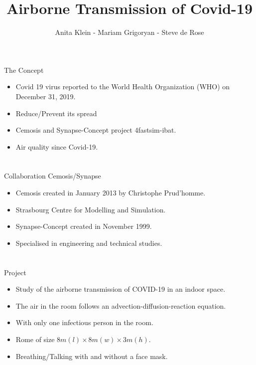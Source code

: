 \documentclass[10pt]{beamer}
\author{Anita Klein - Mariam Grigoryan - Steve de Rose}
\title{Airborne Transmission of Covid-19}
\newcommand{\PI}{}
\newcommand{\PII}{}
\newcommand{\PIII}{}
\begin{document}
    
\begin{frame}

    \maketitle

\end{frame}


\section{\PI} 
\begin{frame}{The Concept}{\PI} 
    \begin{itemize}
        \item Covid 19 virus reported to the World Health Organization (WHO) on December 31, 2019. 
        \item Reduce/Prevent its spread
        \item Cemosis and Synapse-Concept project 4fastsim-ibat. 
        \item Air quality since Covid-19.
    \end{itemize}  

\end{frame}

\section{\PII} 
\begin{frame}{Collaboration Cemosis/Synapse}{\PII} 
    \begin{itemize}
        \item Cemosis created in January 2013 by Christophe Prud’homme. 
        \item Strasbourg Centre for Modelling and Simulation.
        \item Synapse-Concept created in November 1999.
        \item Specialised in engineering and technical studies.
    \end{itemize}  

\end{frame}

\section{\PIII} 
\begin{frame}{Project}{\PIII} 
    \begin{itemize}
        \item Study of the airborne transmission of COVID-19 in an indoor space.
        \item The air in the room follows an advection-diffusion-reaction equation.
        \item With only one infectious person in the room.
        \item Rome of size $8m(l)\times 8m(w) \times 3m(h)$.
        \item Breathing/Talking with and without a face mask.
    \end{itemize}  

\end{frame}
\end{document}
